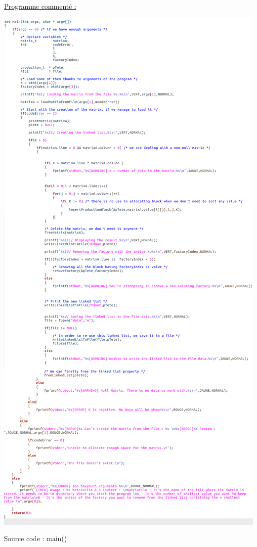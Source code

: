 \documentclass[a4paper]{article}
\begin{document}
\underline{Programme commenté :}
\begin{center}
\includegraphics[scale=0.39]{main.png}

Source code : main()
\end{center}
\end{document}
